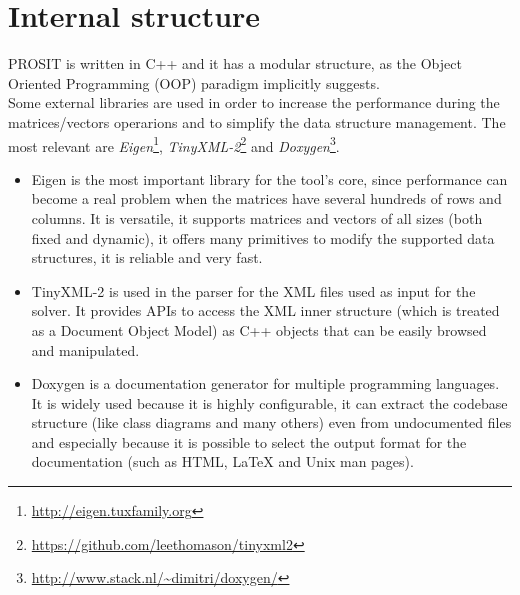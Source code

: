 \section{Internal structure}\label{structure}
PROSIT is written in C++ and it has a modular structure, as the Object Oriented Programming (OOP) paradigm implicitly suggests.\\
Some external libraries are used in order to increase the performance during the matrices/vectors operarions and to simplify the data structure management. The most relevant are \emph{Eigen}\footnote{\url{http://eigen.tuxfamily.org}}, \emph{TinyXML-2}\footnote{\url{https://github.com/leethomason/tinyxml2}} and \emph{Doxygen}\footnote{\url{http://www.stack.nl/~dimitri/doxygen/}}.
\begin{itemize}
  \item Eigen is the most important library for the tool's core, since performance can become a real problem when the matrices have several hundreds of rows and columns. It is versatile, it supports matrices and vectors of all sizes (both fixed and dynamic), it offers many primitives to modify the supported data structures, it is reliable and very fast.
  \item TinyXML-2 is used in the parser for the XML files used as input for the solver. It provides APIs to access the XML inner structure (which is treated as a Document Object Model) as C++ objects that can be easily browsed and manipulated.
  \item Doxygen is a documentation generator for multiple programming languages. It is widely used because it is highly configurable, it can extract the codebase structure (like class diagrams and many others) even from undocumented files and especially because it is possible to select the output format for the documentation (such as HTML, {\LaTeX} and Unix man pages).
\end{itemize}

